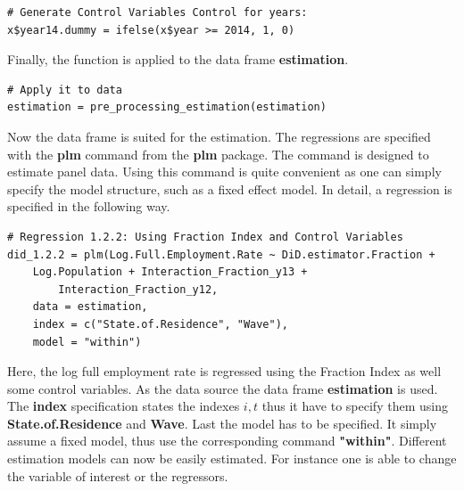 \documentclass[a4paper]{article}
\begin{document}
{\begin{lstlisting}
# Generate Control Variables Control for years:
x$year14.dummy = ifelse(x$year >= 2014, 1, 0)    
\end{lstlisting}
Finally, the function is applied to the data frame \textbf{estimation}.
\begin{lstlisting}
# Apply it to data
estimation = pre_processing_estimation(estimation)
\end{lstlisting}
Now the data frame is suited for the estimation. The regressions are specified with the \textbf{plm} command from the \textbf{plm} package. The command is designed to estimate panel data. Using this command is quite convenient as one can simply specify the model structure, such as a fixed effect model.
In detail, a regression is specified in the following way.
\begin{lstlisting}
# Regression 1.2.2: Using Fraction Index and Control Variables
did_1.2.2 = plm(Log.Full.Employment.Rate ~ DiD.estimator.Fraction + 
	Log.Population + Interaction_Fraction_y13 + 
    	Interaction_Fraction_y12, 
	data = estimation, 
    index = c("State.of.Residence", "Wave"), 
    model = "within")
\end{lstlisting}
Here, the log full employment rate is regressed using the Fraction Index as well some control variables. As the data source the data frame \textbf{estimation} is used. The \textbf{index} specification states the indexes $i, t$ thus it have to specify them using \textbf{State.of.Residence} and \textbf{Wave}. Last the model has to be specified. It simply assume a fixed model, thus use the corresponding command \textbf{"within"}.
Different estimation models can now be easily estimated. For instance one is able to change the variable of interest or the regressors.

}
\end{document}
